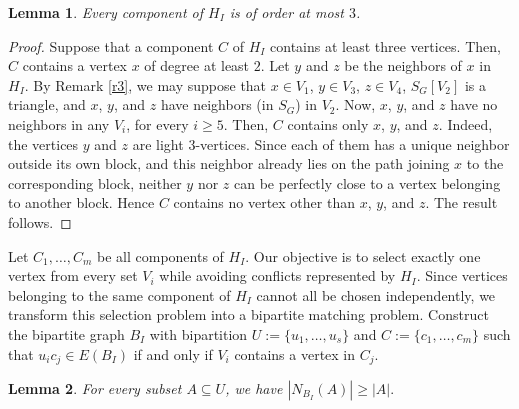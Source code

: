 \documentclass[12pt, oneside]{scrartcl}
\newtheorem{lemma}{Lemma}%
\newtheorem{remark}{Remark}%
\begin{document}
\begin{lemma}\label{l2}
    Every component of $H_I$ is of order at most $3$.
\end{lemma}
\begin{proof}
  Suppose that a component $C$ of $H_I$ contains at least three vertices. Then, $C$ contains a vertex $x$ of degree at least $2$. Let $y$ and $z$ be the neighbors of $x$ in $H_I$. By Remark \ref{r3}, we may suppose that $x\in V_1$, $y\in V_3$, $z\in V_4$, $S_G[V_2]$ is a triangle, and $x$, $y$, and $z$ have neighbors (in $S_G$) in $V_2$. Now, $x$, $y$, and $z$ have no neighbors in any $V_i$, for every $i\geq 5$. Then, $C$ contains only $x$, $y$, and $z$. Indeed, the vertices $y$ and $z$ are light $3$-vertices. Since each of them has a unique neighbor outside its own block, and this neighbor already lies on the path joining $x$ to the corresponding block, neither $y$ nor $z$ can be perfectly close to a vertex belonging to another block. Hence $C$ contains no vertex other than $x$, $y$, and $z$. The result follows.
\end{proof}

Let $C_1,\dots ,C_m$ be all components of $H_I$. Our objective is to select exactly one vertex from every set $V_i$ while avoiding conflicts represented by $H_I$. Since vertices belonging to the same component of $H_I$ cannot all be chosen independently, we transform this selection problem into a bipartite matching problem. Construct the bipartite graph $B_I$ with bipartition $U:=\{u_1,\dots ,u_s\}$ and $C:=\{c_1,\dots ,c_m\}$ such that $u_ic_j\in E(B_I)$ if and only if $V_i$ contains a vertex in $C_j$.

\begin{lemma}\label{l3}
For every subset $A\subseteq U$, we have $|N_{B_I}(A)|\ge |A|.$
\end{lemma}
\end{document}
